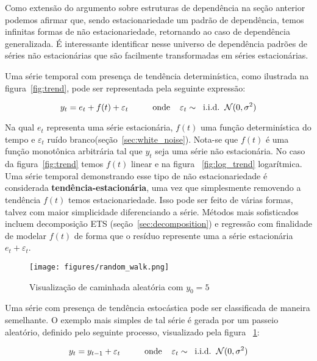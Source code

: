 Como extensão do argumento sobre estruturas de dependência na seção anterior
podemos afirmar que, sendo estacionariedade um padrão de dependência, temos
infinitas formas de não estacionariedade, retornando ao caso de dependência
generalizada. É interessante identificar nesse universo de dependência padrões
de séries não estacionárias que são facilmente transformadas em séries
estacionárias.

Uma série temporal com presença de tendência determinística, como ilustrada na
figura~\ref{fig:trend}, pode ser representada pela seguinte expressão:

$$  y_t = e_t + f(t) + \varepsilon_t  \hspace{1cm}\text{onde} \hspace{.4cm}\varepsilon_t \sim \hspace{.2cm}\text{i.i.d.} \hspace{.2cm}\mathcal{N}(0, \sigma^2)$$

Na qual $e_t$ representa uma série estacionária, $f(t)$ uma função
determinística do tempo e $\varepsilon_t$ ruído
branco(seção~\ref{sec:white_noise}). Nota-se que $f(t)$ é uma função
monotônica arbitrária tal que $y_t$ seja uma série não estacionária. No caso da
figura~\ref{fig:trend} temos $f(t)$ linear e na figura ~\ref{fig:log_trend}
logarítmica. Uma série temporal demonstrando esse tipo de não estacionariedade
é considerada \textbf{tendência-estacionária}, uma vez que simplesmente
removendo a tendência $f(t)$ temos estacionariedade. Isso pode ser feito de
várias formas, talvez com maior simplicidade diferenciando a série. Métodos
mais sofisticados incluem decomposição ETS (seção~\ref{sec:decomposition}) e
regressão com finalidade de modelar $f(t)$ de forma que o resíduo represente
uma a série estacionária $e_t + \varepsilon_t$.

\begin{figure}[h]
    \centering
    \texttt{[image: figures/random\_walk.png]}
    \caption{Visualização de caminhada aleatória com $y_0=5$}
    \label{fig:random_walk}
\end{figure}

Uma série com presença de tendência estocástica pode ser classificada de
maneira semelhante. O exemplo mais simples de tal série é gerada por um
passeio aleatório, definido pelo seguinte processo, visualizado pela figura
~\ref{fig:random_walk}:

$$  y_t = y_{t-1} + \varepsilon_t  \hspace{1cm}\text{onde} \hspace{.4cm}\varepsilon_t \sim \hspace{.2cm}\text{i.i.d.} \hspace{.2cm}\mathcal{N}(0, \sigma^2)$$

